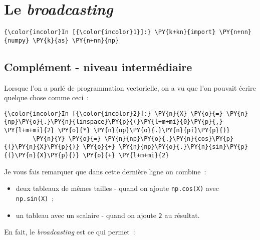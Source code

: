    
    
    
    

    

    \hypertarget{le-broadcasting}{%
\section{\texorpdfstring{Le
\emph{broadcasting}}{Le broadcasting}}\label{le-broadcasting}}

    \begin{Verbatim}[commandchars=\\\{\},frame=single,framerule=0.3mm,rulecolor=\color{cellframecolor}]
{\color{incolor}In [{\color{incolor}1}]:} \PY{k+kn}{import} \PY{n+nn}{numpy} \PY{k}{as} \PY{n+nn}{np}
\end{Verbatim}


    \hypertarget{compluxe9ment---niveau-intermuxe9diaire}{%
\subsection{Complément - niveau
intermédiaire}\label{compluxe9ment---niveau-intermuxe9diaire}}

    Lorsque l'on a parlé de programmation vectorielle, on a vu que l'on
pouvait écrire quelque chose comme ceci~:

    \begin{Verbatim}[commandchars=\\\{\},frame=single,framerule=0.3mm,rulecolor=\color{cellframecolor}]
{\color{incolor}In [{\color{incolor}2}]:} \PY{n}{X} \PY{o}{=} \PY{n}{np}\PY{o}{.}\PY{n}{linspace}\PY{p}{(}\PY{l+m+mi}{0}\PY{p}{,} \PY{l+m+mi}{2} \PY{o}{*} \PY{n}{np}\PY{o}{.}\PY{n}{pi}\PY{p}{)}
        \PY{n}{Y} \PY{o}{=} \PY{n}{np}\PY{o}{.}\PY{n}{cos}\PY{p}{(}\PY{n}{X}\PY{p}{)} \PY{o}{+} \PY{n}{np}\PY{o}{.}\PY{n}{sin}\PY{p}{(}\PY{n}{X}\PY{p}{)} \PY{o}{+} \PY{l+m+mi}{2}
\end{Verbatim}


    Je vous fais remarquer que dans cette dernière ligne on combine~:

\begin{itemize}
\tightlist
\item
  deux tableaux de mêmes tailles - quand on ajoute \texttt{np.cos(X)}
  avec \texttt{np.sin(X)}~;
\item
  un tableau avec un scalaire - quand on ajoute \texttt{2} au résultat.
\end{itemize}

    En fait, le \emph{broadcasting} est ce qui permet~:

